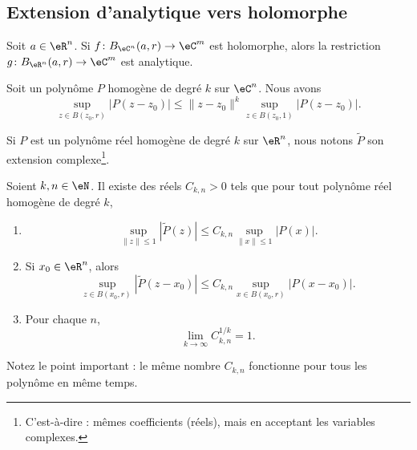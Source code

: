 \subsection{Extension d'analytique vers holomorphe}

\begin{lemma}	\label{LEMooYCSQooIffjUX}
	Soit \( a\in \eR^n\). Si \(f \colon B_{\eC^n}(a,r)\to \eC^m  \) est holomorphe, alors la restriction \(g \colon B_{\eR^n}(a,r)\to \eC^m  \) est analytique.
\end{lemma}


\begin{lemma}	\label{LEMooSOYJooLLilgz}
	Soit un polynôme \( P\) homogène de degré \( k\) sur \( \eC^n\). Nous avons
	\begin{equation}
		\sup_{z\in B(z_0,r)}| P(z-z_0) |\leq \| z-z_0 \|^k\sup_{z\in B(z_0,1)}| P(z-z_0) |.
	\end{equation}
\end{lemma}


\begin{lemma}	\label{LEMooAPNOooJSpgUi}
	Si \( P\) est un polynôme réel homogène de degré \( k\) sur \( \eR^n\), nous notons \( \tilde P\) son extension complexe\footnote{C'est-à-dire : mêmes coefficients (réels), mais en acceptant les variables complexes.}.

	Soient \( k,n\in \eN\). Il existe des réels \( C_{k,n}>0\) tels que pour tout polynôme réel homogène de degré \( k\),
	\begin{enumerate}
		\item
		      \begin{equation}
			      \sup_{\| z \|\leq 1}| \tilde P(z) |\leq C_{k,n}\sup_{\| x \|\leq 1}| P(x) |.
		      \end{equation}
		\item
		      Si \( x_0\in \eR^n\), alors
		      \begin{equation}
			      \sup_{z\in B(x_0,r)}| \tilde P(z-x_0) |\leq C_{k,n}\sup_{x\in B(x_0,r)}| P(x-x_0) |.
		      \end{equation}
		\item
		      Pour chaque \( n\),
		      \begin{equation}
			      \lim_{k\to \infty}C_{k,n}^{1/k}=1.
		      \end{equation}
	\end{enumerate}
	Notez le point important : le même nombre \( C_{k,n}\) fonctionne pour tous les polynôme en même temps.
\end{lemma}


